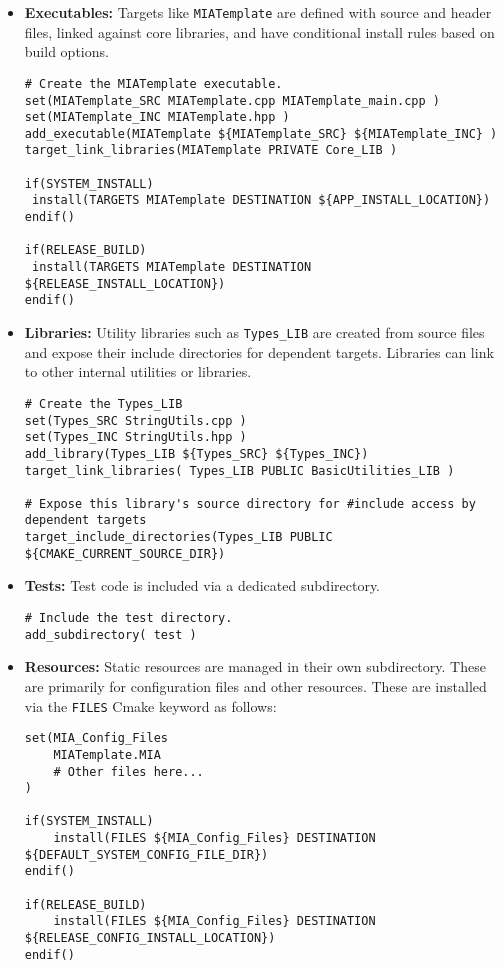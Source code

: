 \begin{itemize}\itemsep0em
	\item \textbf{Executables:} Targets like \texttt{MIATemplate} are defined with source and header files, linked against core libraries, and have conditional install rules based on build options.
	\begin{lstlisting}[style=shellstyle]
# Create the MIATemplate executable.
set(MIATemplate_SRC MIATemplate.cpp MIATemplate_main.cpp )
set(MIATemplate_INC MIATemplate.hpp )
add_executable(MIATemplate ${MIATemplate_SRC} ${MIATemplate_INC} )
target_link_libraries(MIATemplate PRIVATE Core_LIB )

if(SYSTEM_INSTALL)
 install(TARGETS MIATemplate DESTINATION ${APP_INSTALL_LOCATION})
endif()

if(RELEASE_BUILD)
 install(TARGETS MIATemplate DESTINATION ${RELEASE_INSTALL_LOCATION})
endif()
	\end{lstlisting}
	\item \textbf{Libraries:} Utility libraries such as \texttt{Types\_LIB} are created from source files and expose their include directories for dependent targets. Libraries can link to other internal utilities or libraries.
	\begin{lstlisting}[style=shellstyle]
# Create the Types_LIB
set(Types_SRC StringUtils.cpp )
set(Types_INC StringUtils.hpp )
add_library(Types_LIB ${Types_SRC} ${Types_INC})
target_link_libraries( Types_LIB PUBLIC BasicUtilities_LIB )

# Expose this library's source directory for #include access by dependent targets
target_include_directories(Types_LIB PUBLIC ${CMAKE_CURRENT_SOURCE_DIR})
	\end{lstlisting}
	\item \textbf{Tests:} Test code is included via a dedicated subdirectory.
	\begin{lstlisting}[style=shellstyle]
# Include the test directory.
add_subdirectory( test )
	\end{lstlisting}
	\item \textbf{Resources:} Static resources are managed in their own subdirectory. These are primarily for configuration files and other resources. These are installed via the \texttt{FILES} Cmake keyword as follows:
	\begin{lstlisting}[style=shellstyle]
set(MIA_Config_Files
    MIATemplate.MIA
	# Other files here...
)

if(SYSTEM_INSTALL)
    install(FILES ${MIA_Config_Files} DESTINATION ${DEFAULT_SYSTEM_CONFIG_FILE_DIR})
endif()

if(RELEASE_BUILD)
    install(FILES ${MIA_Config_Files} DESTINATION ${RELEASE_CONFIG_INSTALL_LOCATION})
endif()
	\end{lstlisting}
\end{itemize}

